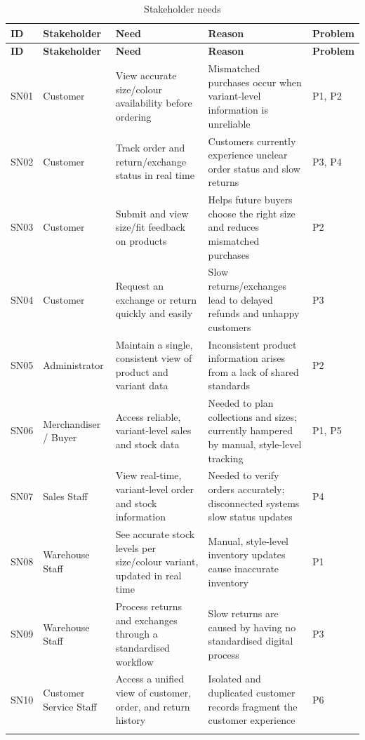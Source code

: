\documentclass[11pt,a4paper,oneside]{extreport}
\begin{document}
\begin{xltabular}{\textwidth}{@{}l L{2.5cm} Y Y l@{}}
\caption{Stakeholder needs}\label{tab:needs}\\
\toprule
\textbf{ID} & \textbf{Stakeholder} & \textbf{Need} & \textbf{Reason} & \textbf{Problem} \\ \midrule
\endfirsthead
\toprule
\textbf{ID} & \textbf{Stakeholder} & \textbf{Need} & \textbf{Reason} & \textbf{Problem} \\ \midrule
\endhead
\bottomrule
\endlastfoot
SN01 & Customer & View accurate size/colour availability before ordering & Mismatched purchases occur when variant-level information is unreliable & P1, P2 \\ \addlinespace
SN02 & Customer & Track order and return/exchange status in real time & Customers currently experience unclear order status and slow returns & P3, P4 \\ \addlinespace
SN03 & Customer & Submit and view size/fit feedback on products & Helps future buyers choose the right size and reduces mismatched purchases & P2 \\ \addlinespace
SN04 & Customer & Request an exchange or return quickly and easily & Slow returns/exchanges lead to delayed refunds and unhappy customers & P3 \\ \addlinespace
SN05 & Administrator & Maintain a single, consistent view of product and variant data & Inconsistent product information arises from a lack of shared standards & P2 \\ \addlinespace
SN06 & Merchandiser / Buyer & Access reliable, variant-level sales and stock data & Needed to plan collections and sizes; currently hampered by manual, style-level tracking & P1, P5 \\ \addlinespace
SN07 & Sales Staff & View real-time, variant-level order and stock information & Needed to verify orders accurately; disconnected systems slow status updates & P4 \\ \addlinespace
SN08 & Warehouse Staff & See accurate stock levels per size/colour variant, updated in real time & Manual, style-level inventory updates cause inaccurate inventory & P1 \\ \addlinespace
SN09 & Warehouse Staff & Process returns and exchanges through a standardised workflow & Slow returns are caused by having no standardised digital process & P3 \\ \addlinespace
SN10 & Customer Service Staff & Access a unified view of customer, order, and return history & Isolated and duplicated customer records fragment the customer experience & P6 \\ \addlinespace

\end{xltabular}
\end{document}
